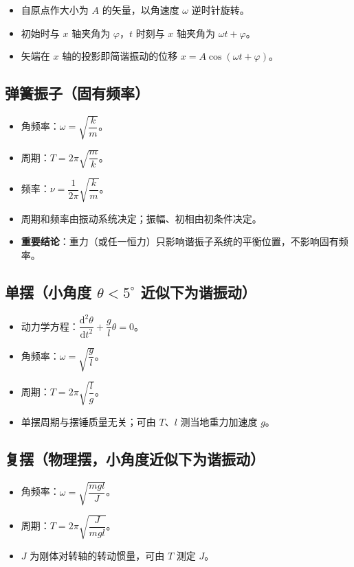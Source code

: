 \documentclass[12pt,a4paper]{ctexart}
\begin{document}
\begin{itemize}
    \item 自原点作大小为 $A$ 的矢量，以角速度 $\omega$ 逆时针旋转。
    \item 初始时与 $x$ 轴夹角为 $\varphi$，$t$ 时刻与 $x$ 轴夹角为 $\omega t+\varphi$。
    \item 矢端在 $x$ 轴的投影即简谐振动的位移 $x=A\cos(\omega t+\varphi)$。
\end{itemize}

\subsection{弹簧振子（固有频率）}

\begin{itemize}
    \item 角频率：$\omega=\sqrt{\dfrac{k}{m}}$。
    \item 周期：$T=2\pi\sqrt{\dfrac{m}{k}}$。
    \item 频率：$\nu=\dfrac{1}{2\pi}\sqrt{\dfrac{k}{m}}$。
    \item 周期和频率由振动系统决定；振幅、初相由初条件决定。
    \item \textbf{重要结论}：重力（或任一恒力）只影响谐振子系统的平衡位置，不影响固有频率。
\end{itemize}

\subsection{单摆（小角度 $\theta<5^\circ$ 近似下为谐振动）}

\begin{itemize}
    \item 动力学方程：$\dfrac{\mathrm{d}^2\theta}{\mathrm{d}t^2}+\dfrac{g}{l}\theta=0$。
    \item 角频率：$\omega=\sqrt{\dfrac{g}{l}}$。
    \item 周期：$T=2\pi\sqrt{\dfrac{l}{g}}$。
    \item 单摆周期与摆锤质量无关；可由 $T$、$l$ 测当地重力加速度 $g$。
\end{itemize}

\subsection{复摆（物理摆，小角度近似下为谐振动）}

\begin{itemize}
    \item 角频率：$\omega=\sqrt{\dfrac{mgl}{J}}$。
    \item 周期：$T=2\pi\sqrt{\dfrac{J}{mgl}}$。
    \item $J$ 为刚体对转轴的转动惯量，可由 $T$ 测定 $J$。
\end{itemize}
\end{document}
